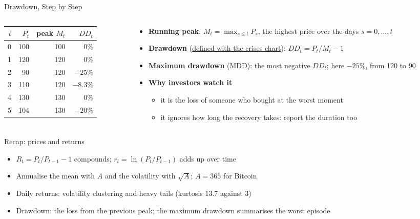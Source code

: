 \begin{frame}{Drawdown, Step by Step}
\itemsize{\footnotesize}
\begin{columns}[T]
\begin{column}{0.38\textwidth}
\begin{center}
\footnotesize
\begin{tabular}{rrrr}
\toprule
$t$ & $P_t$ & peak $M_t$ & $DD_t$ \\
\midrule
0 & 100 & 100 & $0\%$ \\
1 & 120 & 120 & $0\%$ \\
2 & 90 & 120 & $-25\%$ \\
3 & 110 & 120 & $-8.3\%$ \\
4 & 130 & 130 & $0\%$ \\
5 & 104 & 130 & $-20\%$ \\
\bottomrule
\end{tabular}
\end{center}

\end{column}
\begin{column}{0.58\textwidth}
\begin{itemize}
    \item \textbf{Running peak}: $M_t = \max_{s \le t} P_s$, the highest price over the days $s = 0, \ldots, t$
    \item \textbf{Drawdown} (\hyperlink{ch0-dd}{\textcolor{MainBlue}{defined with the crises chart}}): $DD_t = P_t / M_t - 1$
    \item \textbf{Maximum drawdown} (MDD): the most negative $DD_t$; here $-25\%$, from 120 to 90
    \item \textbf{Why investors watch it}
    \begin{itemize}
        \item it is the loss of someone who bought at the worst moment
        \item it ignores how long the recovery takes: report the duration too
    \end{itemize}
\end{itemize}
\end{column}
\end{columns}
\end{frame}

\begin{frame}{Recap: prices and returns}
\itemsize{\small}
\begin{itemize}
    \item $R_t = P_t/P_{t-1} - 1$ compounds; $r_t = \ln(P_t/P_{t-1})$ adds up over time
    \item Annualise the mean with $A$ and the volatility with $\sqrt{A}$; $A = 365$ for Bitcoin
    \item Daily returns: volatility clustering and heavy tails (kurtosis 13.7 against 3)
    \item Drawdown: the loss from the previous peak; the maximum drawdown summarises the worst episode
\end{itemize}
\end{frame}


